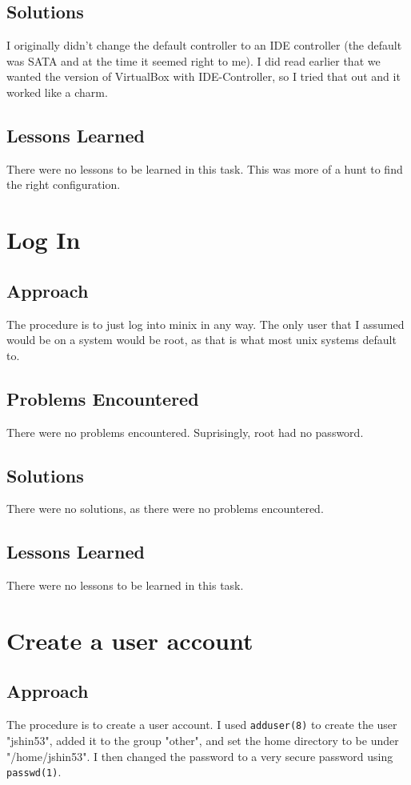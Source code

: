 \documentclass[11pt]{article}
\begin{document}
\subsection{Solutions}
I originally didn't change the default controller to an IDE controller (the default was SATA and at the time it seemed right to me). I did read earlier that we wanted the version of {\sc VirtualBox} with IDE-Controller, so I tried that out and it worked like a charm.

\subsection{Lessons Learned}
There were no lessons to be learned in this task. This was more of a hunt to find the right configuration.

\section{Log In}
\subsection{Approach}
The procedure is to just log into minix in any way. The only user that I assumed would be on a system would be root, as that is what most unix systems default to.

\subsection{Problems Encountered}
There were no problems encountered. Suprisingly, root had no password.

\subsection{Solutions}
There were no solutions, as there were no problems encountered.

\subsection{Lessons Learned}
There were no lessons to be learned in this task.

\section{Create a user account}
\subsection{Approach}
The procedure is to create a user account. I used {\tt adduser(8)} to create the user "jshin53", added it to the group "other", and set the home directory to be under "/home/jshin53". I then changed the password to a very secure password using {\tt passwd(1)}.
\end{document}

